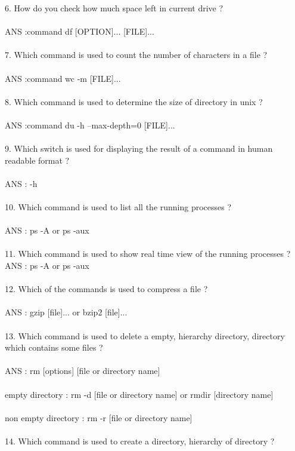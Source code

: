 \documentclass{article}
\begin{document}
6. How do you check how much space left in current drive ? \\ \\
ANS :command  df [OPTION]... [FILE]...
\\ \\
7. Which command is used to count the number of characters in a file ? \\ \\ 
ANS :command  wc -m [FILE]... \\ \\ 
8. Which command is used to determine the size of directory in unix ?\\ \\ 
ANS :command  du -h --max-depth=0 [FILE]...  \\ \\ 
9. Which switch is used for displaying the result of a command in human readable format ? \\ \\ 
ANS : -h \\ \\ 
10. Which command is used to list all the running processes ?
\\ \\
ANS : ps -A or ps -aux\\ \\ 
11. Which command is used to show real time view of the running processes ?
ANS : ps -A or ps -aux \\ \\
12. Which of the commands is used to compress a file ?
\\ \\
ANS : gzip [file]... or bzip2 [file]...\\ \\
13. Which command is used to delete a empty, hierarchy directory, directory which contains some files ? \\ \\
ANS : rm [options] [file or directory name]\\ \\
\hspace*{1cm}empty directory : rm -d [file or directory name] or rmdir [directory name] \\ \\
\hspace*{1cm}non empty directory : rm -r [file or directory name]
\\ \\
14. Which command is used to create a directory, hierarchy of directory ? \\ \\
\end{document}
